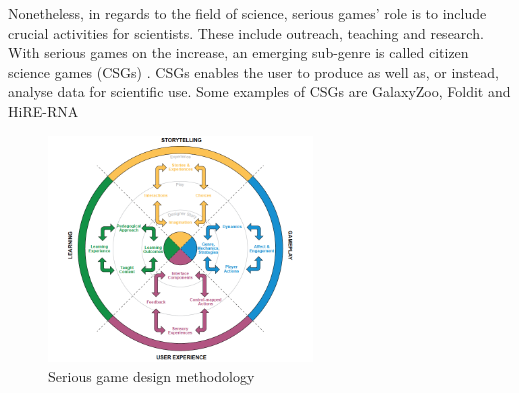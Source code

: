 		Nonetheless, in regards to the field of science, serious games' role is to include crucial activities for scientists. These include outreach, teaching and research. With serious games on the increase, an emerging sub-genre is called citizen science games (CSGs) \cite{10seriousrules}. CSGs enables the user to produce as well as, or instead, analyse data for scientific use. Some examples of CSGs are GalaxyZoo, Foldit and HiRE-RNA \cite{follett2015analysis,mazzanti2017can}
		
		\begin{figure}[t]
			\centering
			\includegraphics[height=6cm]{Serious-game-design-methodology}
			\caption{Serious game design methodology \cite{seriousmeth}}
			\label{fig:seriousg}
		\end{figure}
		
